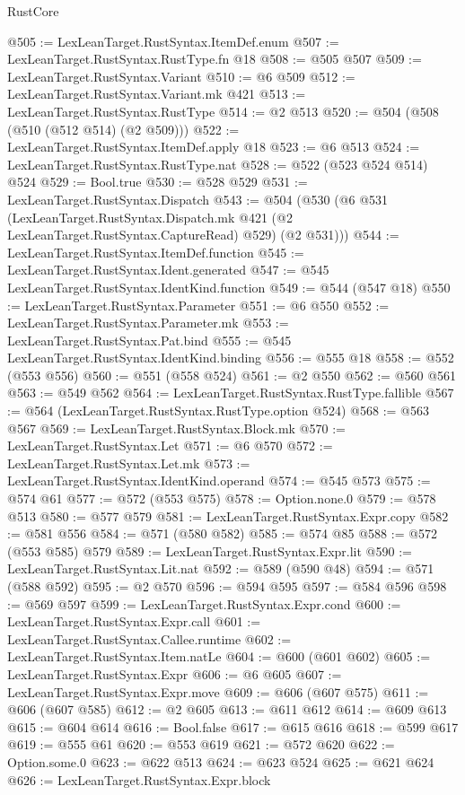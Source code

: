 \begin{lexlean}{RustCore}
\begin{coremodule}
@505 := LexLeanTarget.RustSyntax.ItemDef.enum
@507 := LexLeanTarget.RustSyntax.RustType.fn @18
@508 := @505 @507
@509 := LexLeanTarget.RustSyntax.Variant
@510 := @6 @509
@512 := LexLeanTarget.RustSyntax.Variant.mk @421
@513 := LexLeanTarget.RustSyntax.RustType
@514 := @2 @513
@520 := @504 (@508 (@510 (@512 @514) (@2 @509)))
@522 := LexLeanTarget.RustSyntax.ItemDef.apply @18
@523 := @6 @513
@524 := LexLeanTarget.RustSyntax.RustType.nat
@528 := @522 (@523 @524 @514) @524
@529 := Bool.true
@530 := @528 @529
@531 := LexLeanTarget.RustSyntax.Dispatch
@543 := @504
    (@530
      (@6
        @531
        (LexLeanTarget.RustSyntax.Dispatch.mk @421 (@2 LexLeanTarget.RustSyntax.CaptureRead) @529)
        (@2 @531)))
@544 := LexLeanTarget.RustSyntax.ItemDef.function
@545 := LexLeanTarget.RustSyntax.Ident.generated
@547 := @545 LexLeanTarget.RustSyntax.IdentKind.function
@549 := @544 (@547 @18)
@550 := LexLeanTarget.RustSyntax.Parameter
@551 := @6 @550
@552 := LexLeanTarget.RustSyntax.Parameter.mk
@553 := LexLeanTarget.RustSyntax.Pat.bind
@555 := @545 LexLeanTarget.RustSyntax.IdentKind.binding
@556 := @555 @18
@558 := @552 (@553 @556)
@560 := @551 (@558 @524)
@561 := @2 @550
@562 := @560 @561
@563 := @549 @562
@564 := LexLeanTarget.RustSyntax.RustType.fallible
@567 := @564 (LexLeanTarget.RustSyntax.RustType.option @524)
@568 := @563 @567
@569 := LexLeanTarget.RustSyntax.Block.mk
@570 := LexLeanTarget.RustSyntax.Let
@571 := @6 @570
@572 := LexLeanTarget.RustSyntax.Let.mk
@573 := LexLeanTarget.RustSyntax.IdentKind.operand
@574 := @545 @573
@575 := @574 @61
@577 := @572 (@553 @575)
@578 := Option.none.{0}
@579 := @578 @513
@580 := @577 @579
@581 := LexLeanTarget.RustSyntax.Expr.copy
@582 := @581 @556
@584 := @571 (@580 @582)
@585 := @574 @85
@588 := @572 (@553 @585) @579
@589 := LexLeanTarget.RustSyntax.Expr.lit
@590 := LexLeanTarget.RustSyntax.Lit.nat
@592 := @589 (@590 @48)
@594 := @571 (@588 @592)
@595 := @2 @570
@596 := @594 @595
@597 := @584 @596
@598 := @569 @597
@599 := LexLeanTarget.RustSyntax.Expr.cond
@600 := LexLeanTarget.RustSyntax.Expr.call
@601 := LexLeanTarget.RustSyntax.Callee.runtime
@602 := LexLeanTarget.RustSyntax.Item.natLe
@604 := @600 (@601 @602)
@605 := LexLeanTarget.RustSyntax.Expr
@606 := @6 @605
@607 := LexLeanTarget.RustSyntax.Expr.move
@609 := @606 (@607 @575)
@611 := @606 (@607 @585)
@612 := @2 @605
@613 := @611 @612
@614 := @609 @613
@615 := @604 @614
@616 := Bool.false
@617 := @615 @616
@618 := @599 @617
@619 := @555 @61
@620 := @553 @619
@621 := @572 @620
@622 := Option.some.{0}
@623 := @622 @513
@624 := @623 @524
@625 := @621 @624
@626 := LexLeanTarget.RustSyntax.Expr.block

\end{coremodule}
\end{lexlean}
